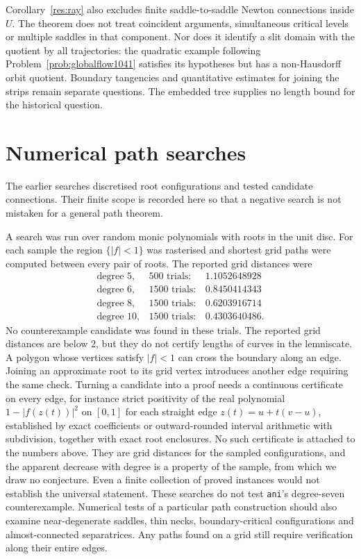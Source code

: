 \documentclass[11pt]{article}
\begin{document}
Corollary~\ref{res:ray} also excludes finite saddle-to-saddle Newton
connections inside $U$. The theorem does not treat coincident arguments,
simultaneous critical levels or multiple saddles in that component. Nor
does it identify a slit domain with the quotient by all trajectories:
the quadratic example following Problem~\ref{prob:globalflow1041} satisfies
its hypotheses but has a non-Hausdorff orbit quotient. Boundary tangencies
and quantitative estimates for joining the strips remain separate questions. The embedded
tree supplies no length bound for the historical question.

\section{Numerical path searches}\label{sec:finite}

The earlier searches discretised root configurations and tested
candidate connections. Their finite scope is recorded here so that a
negative search is not mistaken for a general path theorem.


A search was run over random monic polynomials with roots in the unit disc.  For
each sample the region $\{|f|<1\}$ was rasterised and shortest grid paths were
computed between every pair of roots.  The reported grid distances were
\[
  \begin{array}{lrr}
    \text{degree } 5, & 500 \text{ trials}: & 1.1052648928\\
    \text{degree } 6, & 1500 \text{ trials}: & 0.8450414343\\
    \text{degree } 8, & 1500 \text{ trials}: & 0.6203916714\\
    \text{degree } 10, & 1500 \text{ trials}: & 0.4303640486 .
  \end{array}
\]
No counterexample candidate was found in these trials. The reported
grid distances are below $2$, but they do not certify lengths of curves
in the lemniscate. A polygon whose vertices satisfy $|f|<1$ can cross
the boundary along an edge. Joining an approximate root to its grid
vertex introduces another edge requiring the same check.  Turning a candidate into a proof needs a continuous
certificate on every edge, for instance strict positivity of the real
polynomial $1-|f(z(t))|^2$ on $[0,1]$ for each straight edge $z(t)=u+t(v-u)$,
established by exact coefficients or outward-rounded interval arithmetic with
subdivision, together with exact root enclosures.  No such certificate is
attached to the numbers above.  They are grid distances for the sampled
configurations, and the apparent decrease with degree is a property of the
sample, from which we draw no conjecture.  Even a finite collection of proved instances would not establish
the universal statement. These searches do not test \texttt{ani}'s degree-seven counterexample.
Numerical tests of a particular path construction should also examine
near-degenerate saddles, thin necks, boundary-critical configurations
and almost-connected separatrices. Any paths found on a grid still
require verification along their entire edges.
\end{document}
